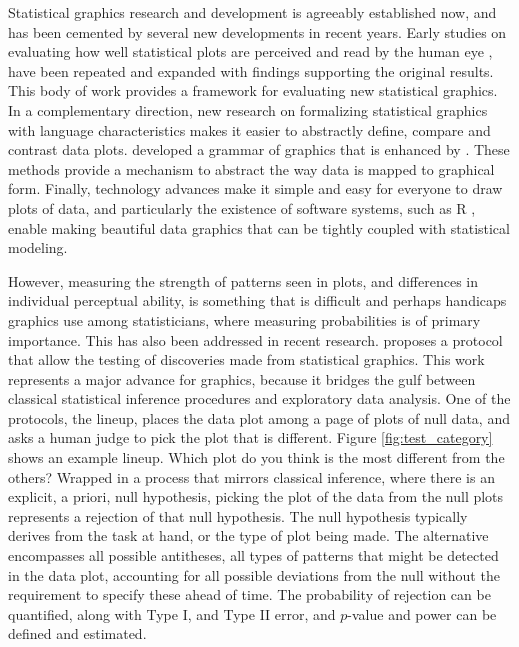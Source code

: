 \documentclass{article}
\begin{document}
Statistical graphics research and development is agreeably established now, and has been cemented by several new developments in recent years. Early studies on evaluating how well statistical plots are perceived and read by the human eye \citep{cleveland:1984}, have been repeated and expanded \citep{heer:2010} with findings supporting the original results. This body of work provides a framework for evaluating new statistical graphics.  In a complementary direction, new research on formalizing statistical graphics with language characteristics makes it easier to abstractly define, compare and contrast data plots. \cite{wilkinson:1999} developed a grammar of graphics that is enhanced by \cite{hadley:2009}. These methods provide a mechanism to abstract the way data is mapped to graphical form. Finally, technology advances make it simple and easy for everyone to draw plots of data, and particularly the existence of software systems, such as R \citep{R}, enable making beautiful data graphics that can be tightly coupled with statistical modeling.

However, measuring the strength of patterns seen in plots, and differences in individual perceptual ability, is something that is difficult and perhaps handicaps graphics  use among statisticians, where measuring probabilities is of primary importance. This has also been addressed in recent research. \citet{buja:2009} proposes a protocol that allow the testing of discoveries made from statistical graphics. This work represents a major advance for graphics, because it bridges the gulf between classical statistical inference procedures and exploratory data analysis. One of the protocols, the lineup, places the data plot among  a page of plots of null data, and asks a human judge to pick the plot that is different. Figure \ref{fig:test_category} shows an example lineup. Which plot do you think is the most different from the others? Wrapped in a process that mirrors classical inference, where there is an explicit, a priori, null hypothesis, picking the plot of the data from the null plots represents a rejection of that null hypothesis. The null hypothesis typically derives from the task at hand, or the type of plot being made. The alternative encompasses all possible antitheses, all types of patterns that might be detected in the data plot, accounting for all possible deviations from the null without the requirement to specify these ahead of time. The probability of rejection can be quantified, along with Type I, and Type II error, and $p$-value and power can be defined and estimated. 
\end{document}
